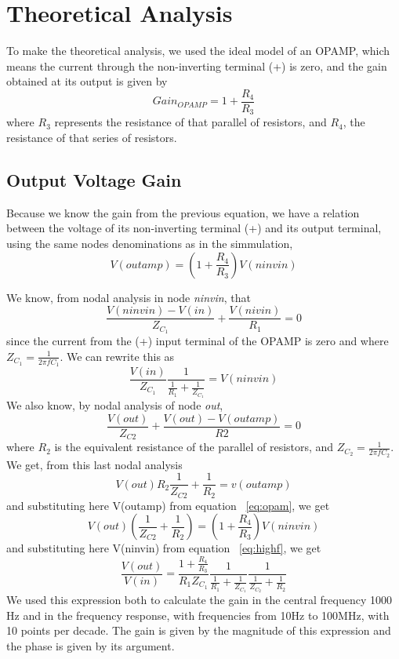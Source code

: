 \section{Theoretical Analysis}
To make the theoretical analysis, we used the ideal model of an OPAMP, which means the current through the non-inverting terminal (+) is zero, and the gain obtained at its output is given by
\begin{equation}
Gain_{OPAMP}=1+\frac{R_4}{R_3}  
\end{equation}
where $R_3$ represents the resistance of that parallel of resistors, and $R_4$, the resistance of that series of resistors.
\subsection{Output Voltage Gain}
Because we know the gain from the previous equation, we have a relation between the voltage of its non-inverting terminal (+) and its output terminal, using the same nodes denominations as in the simmulation,
\begin{equation}\label{eq:opam}
  V(outamp)=(1+\frac{R_4}{R_3})V(ninvin)
\end{equation}

We know, from nodal analysis in node \textit{ninvin}, that
\begin{equation}
  \frac{V(ninvin)-V(in)}{Z_{C_1}}+\frac{V(nivin)}{R_1}=0
\end{equation}
since the current from the (+) input terminal of the OPAMP is zero and where  $Z_{C_1}=\frac{1}{2\pi f C_1}$. We can rewrite this as
\begin{equation}\label{eq:highf}
  \frac{V(in)}{Z_{C_1}}\frac{1}{\frac{1}{R_1}+\frac{1}{Z_{C_1}}}=V(ninvin)
\end{equation}
We also know, by nodal analysis of node \textit{out},
\begin{equation}
  \frac{V(out)}{Z_{C2}}+\frac{V(out)-V(outamp)}{R2}=0
\end{equation}
where $R_2$ is the equivalent resistance of the parallel of resistors, and $Z_{C_2}=\frac{1}{2\pi f C_2}$.\\
We get, from this last nodal analysis
\begin{equation}
  V(out)R_2\frac{1}{Z_{C2}}+\frac{1}{R_2}=v(outamp)
\end{equation}
and substituting here V(outamp) from equation ~\ref{eq:opam}, we get
\begin{equation}
  V(out)(\frac{1}{Z_{C2}}+\frac{1}{R_2})=(1+\frac{R_4}{R_3})V(ninvin)
\end{equation}
and substituting here V(ninvin) from equation ~\ref{eq:highf}, we get
\begin{equation}
  \frac{V(out)}{V(in)}=\frac{1+\frac{R_4}{R_3}}{R_1 Z_{C_1}}\frac{1}{\frac{1}{R_1}+\frac{1}{Z_{C_1}}}\frac{1}{\frac{1}{Z_{C_2}}+\frac{1}{R_2}}
\end{equation}
We used this expression both to calculate the gain in the central frequency 1000 Hz and in the frequency response, with frequencies from 10Hz to 100MHz, with 10 points per decade. The gain is given by the magnitude of this expression and the phase is given by its argument.
